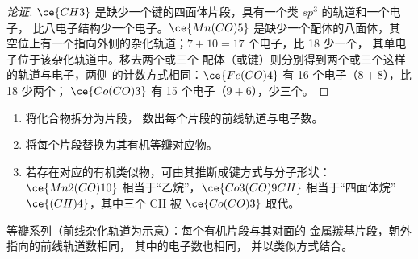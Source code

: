 \begin{proof}[论证]
$\ce{CH3}$ 是缺少一个键的四面体片段，具有一个类 $sp^3$ 的轨道和一个电子，
比八电子结构少一个电子。$\ce{Mn(CO)5}$ 是缺少一个配体的八面体，其
空位上有一个指向外侧的杂化轨道；$7 + 10 = 17$ 个电子，比 18 少一个，
其单电子位于该杂化轨道中。移去两个或三个
配体（或键）则分别得到两个或三个这样的轨道与电子，两侧
的计数方式相同：$\ce{Fe(CO)4}$ 有 16 个电子（$8 + 8$），比 18 少两个；
$\ce{Co(CO)3}$ 有 15 个电子（$9 + 6$），少三个。
\end{proof}

\begin{method}[通过等瓣替换预测结构]\label{met:b3:organometallic-bonding:isolobal}
\begin{enumerate}
  \item 将化合物拆分为片段，
        数出每个片段的前线轨道与电子数。
  \item 将每个片段替换为其有机等瓣对应物。
  \item 若存在对应的有机类似物，可由其推断成键方式与分子形状：
        $\ce{Mn2(CO)10}$ 相当于“乙烷”，$\ce{Co3(CO)9CH}$ 相当于“四面体烷” $\ce{(CH)4}$，其中三个 CH
        被 $\ce{Co(CO)3}$ 取代。
\end{enumerate}
\end{method}

\begin{omfigure}

{\small 等瓣系列（前线杂化轨道为示意）：每个有机片段与其对面的
金属羰基片段，朝外指向的前线轨道数相同，
其中的电子数也相同，
并以类似方式结合。}
\end{omfigure}

